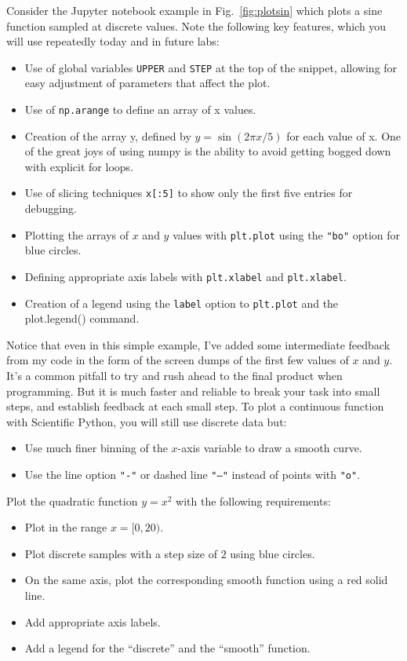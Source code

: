 Consider the Jupyter notebook example in Fig.~\ref{fig:plotsin} which plots a sine function sampled at discrete values.  Note the following key features, which you will use repeatedly today and in future labs:
\begin{itemize}
\item Use of global variables {\tt UPPER} and {\tt STEP} at the top of the snippet, allowing for easy adjustment of parameters that affect the plot.
\item Use of {\tt np.arange} to define an array of x values.
\item Creation of the array y, defined by $y = \sin(2\pi x / 5)$ for each value of x.  One of the great joys of using numpy is the ability to avoid getting bogged down with explicit for loops.
\item Use of slicing techniques {\tt x[:5]} to show only the first five entries for debugging.  
\item Plotting the arrays of $x$ and $y$ values with {\tt plt.plot}  using the {\tt "bo"} option for blue circles.
\item Defining appropriate axis labels with {\tt plt.xlabel} and {\tt plt.xlabel}. 
\item Creation of a legend using the {\tt label} option to {\tt plt.plot} and the {plot.legend()} command.
\end{itemize}
Notice that even in this simple example, I've added some intermediate feedback from my code in the form of the screen dumps of the first few values of $x$ and $y$.  It's a common pitfall to try and rush ahead to the final product when programming.  But it is much faster and reliable to break your task into small steps, and establish feedback at each small step. 
	To plot a continuous function with Scientific Python, you will still use discrete data but:
\begin{itemize}
 \item Use much finer binning of the $x$-axis variable to draw a smooth curve. 
 \item Use the line option {\tt "-"} or dashed line {\tt "--"} instead of points with {\tt "o"}. 
\end{itemize} 

\noindent
\begin{plot} \end{plot}
Plot the quadratic function $y = x^2$ with the following requirements:
\begin{itemize}
 \item Plot in the range $x = [0,20)$.
 \item Plot discrete samples with a step size of $2$ using blue circles.
 \item On the same axis, plot the corresponding smooth function using a red solid line.
 \item Add appropriate axis labels. 
 \item Add a legend for the ``discrete'' and the ``smooth''  function.
\end{itemize}

